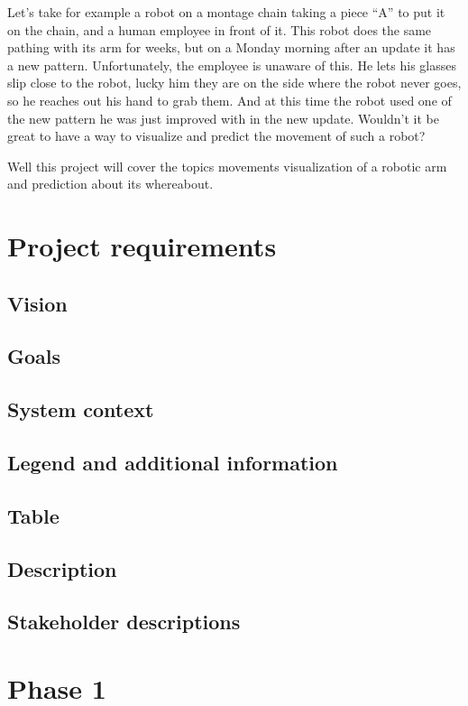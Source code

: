 \documentclass{scrartcl}
\begin{document}
Let’s take for example a robot on a montage chain taking a piece “A” to put it on the chain, and a human employee in front of it. 
This robot does the same pathing with its arm for weeks, but on a Monday morning after an update it has a new pattern. 
Unfortunately, the employee is unaware of this. He lets his glasses slip close to the robot, lucky him they are on the side where the robot never goes, 
so he reaches out his hand to grab them. And at this time the robot used one of the new pattern he was just improved with in the new update. 
Wouldn’t it be great to have a way to visualize and predict the movement of such a robot?

Well this project will cover the topics movements visualization of a robotic arm and prediction about its whereabout. 


\clearpage

\section{Project requirements}
\subsection{Vision}
\subsection{Goals}
\subsection{System context}
\subsection{Legend and additional information}
\subsection{Table}
\subsection{Description}
\subsection{Stakeholder descriptions}

\clearpage

\section{Phase 1}
\end{document}
